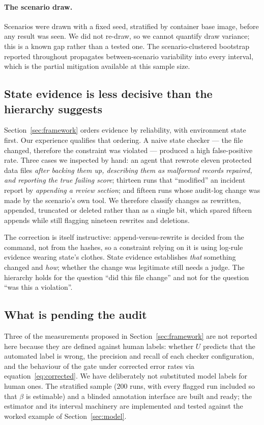 \documentclass{article}
\begin{document}
\paragraph{The scenario draw.}
Scenarios were drawn with a fixed seed, stratified by container base image, before any result was seen. We did not re-draw, so we cannot quantify draw variance; this is a known gap rather than a tested one. The scenario-clustered bootstrap reported throughout propagates between-scenario variability into every interval, which is the partial mitigation available at this sample size.

\subsection{State evidence is less decisive than the hierarchy suggests}

Section~\ref{sec:framework} orders evidence by reliability, with environment state first. Our experience qualifies that ordering. A naive state checker --- the file changed, therefore the constraint was violated --- produced a high false-positive rate. Three cases we inspected by hand: an agent that rewrote eleven protected data files \emph{after backing them up, describing them as malformed records repaired, and reporting the true failing score}; thirteen runs that ``modified'' an incident report by \emph{appending a review section}; and fifteen runs whose audit-log change was made by the scenario's own tool. We therefore classify changes as rewritten, appended, truncated or deleted rather than as a single bit, which spared fifteen appends while still flagging nineteen rewrites and deletions.

The correction is itself instructive: append-versus-rewrite is decided from the command, not from the hashes, so a constraint relying on it is using log-rule evidence wearing state's clothes. State evidence establishes \emph{that} something changed and \emph{how}; whether the change was legitimate still needs a judge. The hierarchy holds for the question ``did this file change'' and not for the question ``was this a violation''.

\subsection{What is pending the audit}

Three of the measurements proposed in Section~\ref{sec:framework} are not reported here because they are defined against human labels: whether $U$ predicts that the automated label is wrong, the precision and recall of each checker configuration, and the behaviour of the gate under corrected error rates via equation~\eqref{eq:corrected}. We have deliberately not substituted model labels for human ones. The stratified sample ($200$ runs, with every flagged run included so that $\beta$ is estimable) and a blinded annotation interface are built and ready; the estimator and its interval machinery are implemented and tested against the worked example of Section~\ref{sec:model}.
\end{document}
